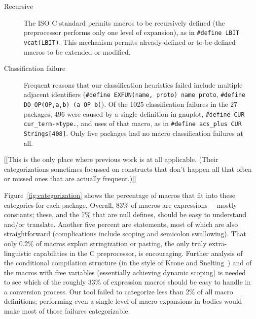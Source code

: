 \documentclass[11pt]{article}
\def\numpackages{27}
\begin{document}
\begin{description}
\item[Recursive]  The ISO C standard permits macros to be recursively
  defined (the preprocessor performs only one level of expansion), as in
  {\tt \#define LBIT vcat(LBIT)}.  This mechanism permits already-defined
  or to-be-defined macros to be extended or modified.

\item[Classification failure]  Frequent reasons that our
  classification heuristics failed include multiple adjacent identifiers
  ({\tt \#define EXFUN(name, proto) name proto}, {\tt \#define
  \verb|DO_OP|(OP,a,b) (a OP b)}).  Of the 1025 classification failures in
the {\numpackages} packages, 496 were caused by a single definition in
gnuplot, {\tt \#define CUR \verb|cur_term->type.|}, and uses of that macro,
as in {\tt \#define \verb|acs_plus| CUR Strings[408]}.  Only five packages
had no macro classification failures at all.



\end{description}

[[This is the only place where previous work is at all applicable.
(Their categorizations sometimes focussed on constructs that don't happen
all that often or missed ones that are actually frequent.)]]


Figure~\ref{fig:categorization} shows the percentage of macros that fit
into these categories for each package.  Overall, 83\% of macros are
expressions\,---\,mostly constants; these, and the 7\% that are null
defines, should be easy to understand and/or translate.  Another five
percent are statements, most of which are also straightforward
(complications include scoping and semicolon swallowing).  That only 0.2\%
of macros exploit stringization or pasting, the only truly extra-linguistic
capabilities in the C preprocessor, is encouraging.  Further analysis of
the conditional compilation structure (in the style of Krone and
Snelting~\cite{Krone94}) and of the macros with free variables (essentially
achieving dynamic scoping) is needed to see which of the roughly 33\% of
expression macros should be easy to handle in a conversion process.  Our
tool failed to categorize less than 2\% of all macro definitions;
performing even a single level of macro expansions in bodies would make
most of those failures categorizable.
\end{document}

